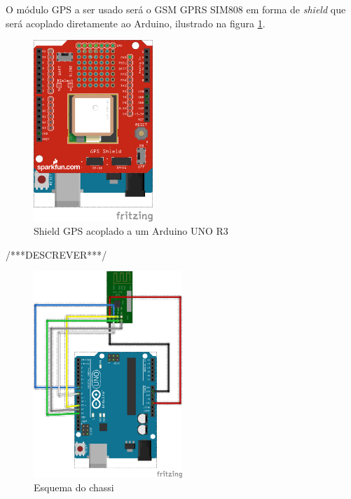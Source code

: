 O módulo GPS a ser usado será o GSM GPRS SIM808 em forma de\textit{ shield} que será acoplado diretamente ao Arduino, ilustrado na figura \ref{fig:gps:vaa}.
\begin{figure}[H]
    \centering
    \includegraphics[width=0.4\textwidth]{figuras/arduinoGPS_bb.png}
    \caption{Shield GPS acoplado a um Arduino UNO R3}
    \label{fig:gps:vaa}
\end{figure}


/***DESCREVER***/

\begin{figure}[H]
    \centering
    \includegraphics[width=0.5\textwidth]{figuras/radio_bb.png}
    \caption{Esquema do chassi}
    \label{fig:sketchup:vaa}
\end{figure}

